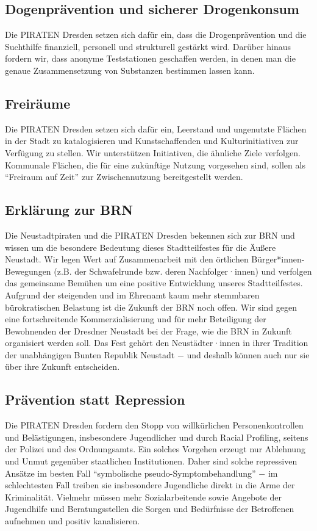 \documentclass[a4paper, 11pt]{article}
\begin{document}
\subsection{Dogenprävention und sicherer Drogenkonsum}
Die PIRATEN Dresden setzen sich dafür ein, dass die Drogenprävention und die Suchthilfe finanziell, personell und strukturell gestärkt wird. Darüber hinaus fordern wir, dass anonyme Teststationen geschaffen werden, in denen man die genaue Zusammensetzung von Substanzen bestimmen lassen kann.


\subsection{Freiräume}
Die PIRATEN Dresden setzen sich dafür ein, Leerstand und ungenutzte Flächen in der Stadt zu katalogisieren und Kunstschaffenden und Kulturinitiativen zur Verfügung zu stellen. Wir unterstützen Initiativen, die ähnliche Ziele verfolgen. Kommunale Flächen, die für eine zukünftige Nutzung vorgesehen sind, sollen als ``Freiraum auf Zeit'' zur Zwischennutzung bereitgestellt werden.


\subsection{Erklärung zur BRN}
Die Neustadtpiraten und die PIRATEN Dresden bekennen sich zur BRN und wissen um die besondere Bedeutung dieses Stadtteilfestes für die Äußere Neustadt. Wir legen Wert auf Zusammenarbeit mit den örtlichen Bürger*innen-Bewegungen (z.B. der Schwafelrunde bzw. deren Nachfolger·innen) und verfolgen das gemeinsame Bemühen um eine positive Entwicklung unseres Stadtteilfestes. Aufgrund der steigenden und im Ehrenamt kaum mehr stemmbaren bürokratischen Belastung ist die Zukunft der BRN noch offen. Wir sind gegen eine fortschreitende Kommerzialisierung und für mehr Beteiligung der Bewohnenden der Dresdner Neustadt bei der Frage, wie die BRN in Zukunft organisiert werden soll. Das Fest gehört den Neustädter·innen in ihrer Tradition der unabhängigen Bunten Republik Neustadt $-$ und deshalb können auch nur sie über ihre Zukunft entscheiden.



\subsection{Prävention statt Repression}
Die PIRATEN Dresden fordern den Stopp von willkürlichen Personenkontrollen und Belästigungen, insbesondere Jugendlicher und durch Racial Profiling, seitens der Polizei und des Ordnungsamts. Ein solches Vorgehen erzeugt nur Ablehnung und Unmut gegenüber staatlichen Institutionen. Daher sind solche repressiven Ansätze im besten Fall ``symbolische pseudo-Symptombehandlung'' $-$ im schlechtesten Fall treiben sie insbesondere Jugendliche direkt in die Arme der Kriminalität. Vielmehr müssen mehr Sozialarbeitende sowie Angebote der Jugendhilfe und Beratungsstellen die Sorgen und Bedürfnisse der Betroffenen aufnehmen und positiv kanalisieren.
\end{document}

